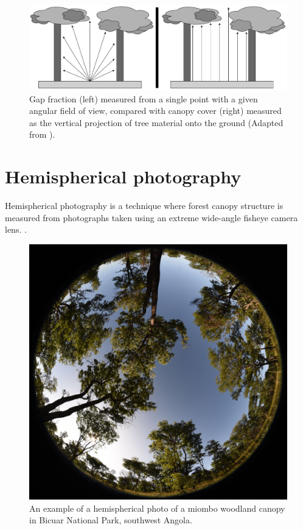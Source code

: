 \documentclass[11pt,a4paper]{article}
\begin{document}
\begin{figure}[H]
\centering
	\includegraphics[width=\textwidth]{closure.drawio.pdf}
	\caption{Gap fraction (left) measured from a single point with a given angular field of view, compared with canopy cover (right) measured as the vertical projection of tree material onto the ground (Adapted from \citealt{Jennings1999}).}
	\label{closure}
\end{figure}

\section{Hemispherical photography}

Hemispherical photography is a technique where forest canopy structure is measured from photographs taken using an extreme wide-angle fisheye camera lens. \citep{Seidel2011, Macfarlane2014}. 

\begin{figure}[H]
\centering
	\includegraphics[width=\textwidth]{hemi.jpg}
	\caption{An example of a hemispherical photo of a miombo woodland canopy in Bicuar National Park, southwest Angola.}
	\label{hemi}
\end{figure}
\end{document}
